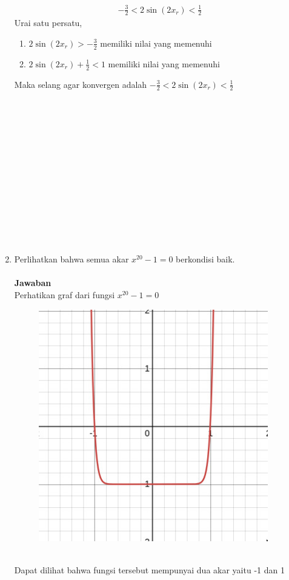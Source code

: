 \documentclass[fleqn]{article}
\newcommand{\jaw}{\\ \textbf{Jawaban} \\}
\begin{document}
\begin{enumerate}
\begin{align*}
				-\frac{3}{2} < 2 \sin(2x_r) < \frac{1}{2} 
			\end{align*}
			Urai satu persatu, 
			\begin{enumerate}[label=\roman*.]
				\item $2 \sin(2x_r)>-\frac{3}{2}$ memiliki nilai yang memenuhi
				\item $2 \sin(2x_r) + \frac{1}{2} < 1$ memiliki nilai yang memenuhi
			\end{enumerate}
			Maka selang agar konvergen adalah $-\frac{3}{2} < 2 \sin(2x_r) < \frac{1}{2}$ \\ \\ \\ \\ \\ \\ \\ \\ \\ \\ \\ \\ \\ \\
		\item Perlihatkan bahwa semua akar $x^{20} - 1 = 0$ berkondisi baik. \\
			\jaw
			Perhatikan graf dari fungsi $x^{20} - 1 = 0$ \\
			\begin{figure}[tph!]
				\includegraphics[width=10cm]{graph20.png}
			\end{figure} \\
			Dapat dilihat bahwa fungsi tersebut mempunyai dua akar yaitu -1 dan 1

\end{enumerate}
\end{document}
